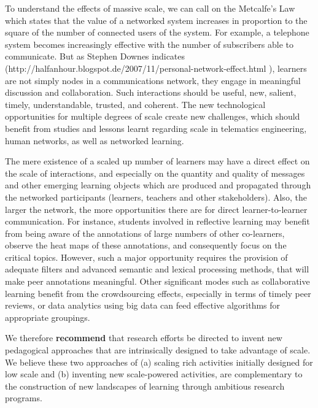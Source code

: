 To understand the effects of massive scale, we can call on the
Metcalfe’s Law which states that the value of a networked system
increases in proportion to the square of the number of connected users
of the system. For example, a telephone system becomes increasingly
effective with the number of subscribers able to communicate. But as
Stephen Downes indicates
(http://halfanhour.blogspot.de/2007/11/personal-network-effect.html ),
learners are not simply nodes in a communications network, they engage
in meaningful discussion and collaboration. Such interactions should be
useful, new, salient, timely, understandable, trusted, and coherent. The
new technological opportunities for multiple degrees of scale create new
challenges, which should benefit from studies and lessons learnt
regarding scale in telematics engineering, human networks, as well as
networked learning.

The mere existence of a scaled up number of learners may have a direct
effect on the scale of interactions, and especially on the quantity and
quality of messages and other emerging learning objects which are
produced and propagated through the networked participants (learners,
teachers and other stakeholders). Also, the larger the network, the more
opportunities there are for direct learner-to-learner communication. For
instance, students involved in reflective learning may benefit from
being aware of the annotations of large numbers of other co-learners,
observe the heat maps of these annotations, and consequently focus on
the critical topics. However, such a major opportunity requires the
provision of adequate filters and advanced semantic and lexical
processing methods, that will make peer annotations meaningful. Other
significant modes such as collaborative learning benefit from the
crowdsourcing effects, especially in terms of timely peer reviews, or
data analytics using big data can feed effective algorithms for
appropriate groupings.

We therefore \textbf{recommend} that research efforts be directed to invent new
pedagogical approaches that are intrinsically designed to take advantage
of scale. We believe these two approaches of (a) scaling rich activities
initially designed for low scale and (b) inventing new scale-powered
activities, are complementary to the construction of new landscapes of
learning through ambitious research programs.
